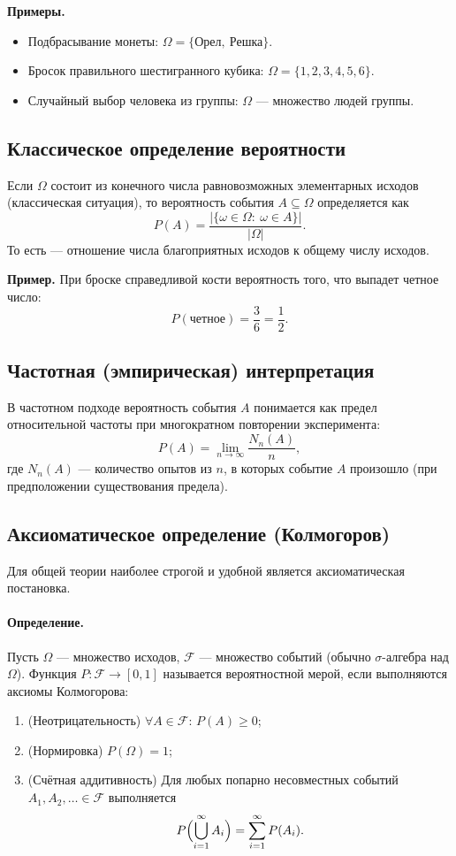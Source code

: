\medskip
\textbf{Примеры.}
\begin{itemize}
  \item Подбрасывание монеты: $\Omega=\{\text{Орел},\ \text{Решка}\}$.
  \item Бросок правильного шестигранного кубика: $\Omega=\{1,2,3,4,5,6\}$.
  \item Случайный выбор человека из группы: $\Omega$ — множество людей группы.
\end{itemize}

\subsection{Классическое определение вероятности}
Если $\Omega$ состоит из конечного числа равновозможных элементарных исходов (классическая ситуация), то вероятность события $A\subseteq\Omega$ определяется как
\[
P(A) = \frac{|\{\omega\in\Omega:\ \omega\in A\}|}{|\Omega|}.
\]
То есть — отношение числа благоприятных исходов к общему числу исходов.

\textbf{Пример.} При броске справедливой кости вероятность того, что выпадет четное число:
\[
P(\text{четное}) = \frac{3}{6} = \frac{1}{2}.
\]

\subsection{Частотная (эмпирическая) интерпретация}
В частотном подходе вероятность события $A$ понимается как предел относительной частоты при многократном повторении эксперимента:
\[
P(A) = \lim_{n\to\infty} \frac{N_n(A)}{n},
\]
где $N_n(A)$ — количество опытов из $n$, в которых событие $A$ произошло (при предположении существования предела).

\subsection{Аксиоматическое определение (Колмогоров)}
Для общей теории наиболее строгой и удобной является аксиоматическая постановка.

\paragraph{Определение.} Пусть $\Omega$ — множество исходов, $\mathcal{F}$ — множество событий (обычно $\sigma$-алгебра над $\Omega$). Функция $P:\mathcal{F}\to[0,1]$ называется вероятностной мерой, если выполняются аксиомы Колмогорова:
\begin{enumerate}
  \item (Неотрицательность) $\forall A\in\mathcal{F}$: $P(A)\ge 0$;
  \item (Нормировка) $P(\Omega)=1$;
  \item (Счётная аддитивность) Для любых попарно несовместных событий $A_1,A_2,\dots\in\mathcal{F}$ выполняется
  \[
  P\Bigl(\bigcup_{i=1}^{\infty} A_i\Bigr) = \sum_{i=1}^{\infty} P(A_i).
  \]
\end{enumerate}

